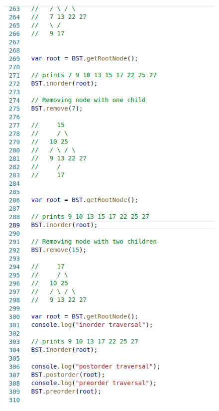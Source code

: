     \begin{figure}[h]
    	\centering
    	\includegraphics[width=0.9\linewidth]{Pictures/BST_Code3}
    	\caption{}
    	\label{fig:bstcode3}
    \end{figure}
